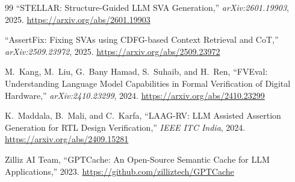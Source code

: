 \documentclass[12pt,a4paper]{article}
\begin{document}
\begin{thebibliography}{99}
``STELLAR: Structure-Guided LLM SVA Generation,''
\textit{arXiv:2601.19903}, 2025.
\newline \url{https://arxiv.org/abs/2601.19903}

``AssertFix: Fixing SVAs using CDFG-based Context Retrieval and CoT,''
\textit{arXiv:2509.23972}, 2025.
\newline \url{https://arxiv.org/abs/2509.23972}

M.~Kang, M.~Liu, G.~Bany Hamad, S.~Suhaib, and H.~Ren,
``FVEval: Understanding Language Model Capabilities in Formal Verification of
Digital Hardware,''
\textit{arXiv:2410.23299}, 2024.
\newline \url{https://arxiv.org/abs/2410.23299}

K.~Maddala, B.~Mali, and C.~Karfa,
``LAAG-RV: LLM Assisted Assertion Generation for RTL Design Verification,''
\textit{IEEE ITC India}, 2024.
\newline \url{https://arxiv.org/abs/2409.15281}

Zilliz AI Team,
``GPTCache: An Open-Source Semantic Cache for LLM Applications,''
2023.
\newline \url{https://github.com/zilliztech/GPTCache}

\end{thebibliography}
\end{document}
